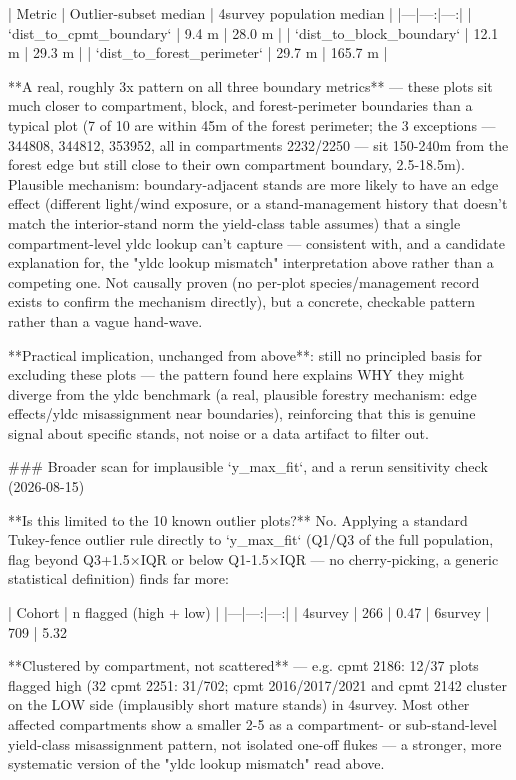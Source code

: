 | Metric | Outlier-subset median | 4survey population median |
|---|---:|---:|
| `dist_to_cpmt_boundary` | 9.4 m | 28.0 m |
| `dist_to_block_boundary` | 12.1 m | 29.3 m |
| `dist_to_forest_perimeter` | 29.7 m | 165.7 m |

**A real, roughly 3x pattern on all three boundary metrics** — these plots sit much closer to
compartment, block, and forest-perimeter boundaries than a typical plot (7 of 10 are within 45m of
the forest perimeter; the 3 exceptions — 344808, 344812, 353952, all in compartments 2232/2250 —
sit 150-240m from the forest edge but still close to their own compartment boundary, 2.5-18.5m).
Plausible mechanism: boundary-adjacent stands are more likely to have an edge effect (different
light/wind exposure, or a stand-management history that doesn't match the interior-stand norm the
yield-class table assumes) that a single compartment-level yldc lookup can't capture — consistent
with, and a candidate explanation for, the "yldc lookup mismatch" interpretation above rather than
a competing one. Not causally proven (no per-plot species/management record exists to confirm the
mechanism directly), but a concrete, checkable pattern rather than a vague hand-wave.

**Practical implication, unchanged from above**: still no principled basis for excluding these
plots — the pattern found here explains WHY they might diverge from the yldc benchmark (a real,
plausible forestry mechanism: edge effects/yldc misassignment near boundaries), reinforcing that
this is genuine signal about specific stands, not noise or a data artifact to filter out.

### Broader scan for implausible `y_max_fit`, and a rerun sensitivity check (2026-08-15)

**Is this limited to the 10 known outlier plots?** No. Applying a standard Tukey-fence outlier
rule directly to `y_max_fit` (Q1/Q3 of the full population, flag beyond Q3+1.5×IQR or below
Q1-1.5×IQR — no cherry-picking, a generic statistical definition) finds far more:

| Cohort | n flagged (high + low) | %
|---|---:|---:|
| 4survey | 266 | 0.47%
| 6survey | 709 | 5.32%

**Clustered by compartment, not scattered** — e.g. cpmt 2186: 12/37 plots flagged high (32%
cpmt 2251: 31/702; cpmt 2016/2017/2021 and cpmt 2142 cluster on the LOW side (implausibly short
mature stands) in 4survey. Most other affected compartments show a smaller 2-5%
as a compartment- or sub-stand-level yield-class misassignment pattern, not isolated one-off flukes
— a stronger, more systematic version of the "yldc lookup mismatch" read above.

